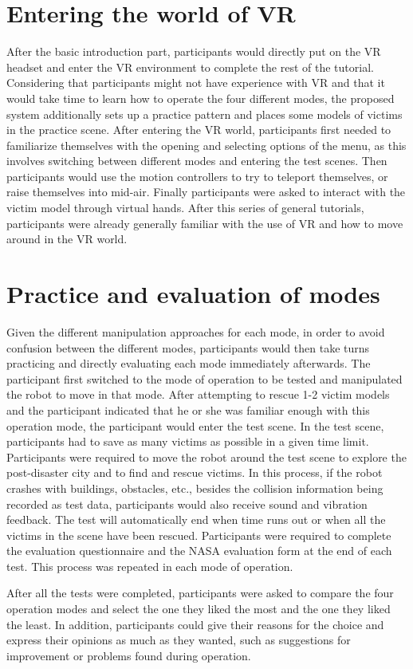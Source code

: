 \section{Entering the world of VR}
After the basic introduction part, participants would directly put on the VR headset and enter the VR environment to complete the rest of the tutorial. Considering that participants might not have experience with VR and that it would take time to learn how to operate the four different modes, the proposed system additionally sets up a practice pattern and places some models of victims in the practice scene. After entering the VR world, participants first needed to familiarize themselves with the opening and selecting options of the menu, as this involves switching between different modes and entering the test scenes. Then participants would use the motion controllers to try to teleport themselves, or raise themselves into mid-air. Finally participants were asked to interact with the victim model through virtual hands. After this series of general tutorials, participants were already generally familiar with the use of VR and how to move around in the VR world.



\section{Practice and evaluation of modes}
Given the different manipulation approaches for each mode, in order to avoid confusion between the different modes, participants would then take turns practicing and directly evaluating each mode immediately afterwards. The participant first switched to the mode of operation to be tested and manipulated the robot to move in that mode. After attempting to rescue 1-2 victim models and the participant indicated that he or she was familiar enough with this operation mode, the participant would enter the test scene. In the test scene, participants had to save as many victims as possible in a given time limit. Participants were required to move the robot around the test scene to explore the post-disaster city and to find and rescue victims. In this process, if the robot crashes with buildings, obstacles, etc., besides the collision information being recorded as test data, participants would also receive sound and vibration feedback. The test will automatically end when time runs out or when all the victims in the scene have been rescued. Participants were required to complete the evaluation questionnaire and the NASA evaluation form at the end of each test. This process was repeated in each mode of operation. 

After all the tests were completed, participants were asked to compare the four operation modes and select the one they liked the most and the one they liked the least. In addition, participants could give their reasons for the choice and express their opinions as much as they wanted, such as suggestions for improvement or problems found during operation.
